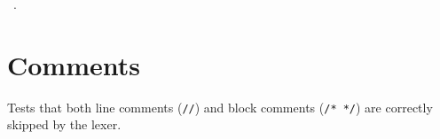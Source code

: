 \documentclass[11pt,a4paper,twoside,openright,DIV=15]{scrbook}
\theoremstyle{definition}
\theoremstyle{plain}
\theoremstyle{remark}
\begin{document}
\begin{flushleft}
\begin{minipage}{\linewidth}
\vspace{-1.5ex}
\footnotesize
\begin{list}{}{\setlength{\itemsep}{-\parsep}\setlength{\itemindent}{-\leftmargin}}
\item \NWtxtMacroRefIn\ .

\item{}
\end{list}
\end{minipage}\vspace{4ex}
\end{flushleft}
\section{Comments}

Tests that both line comments (\texttt{//}) and block comments
(\texttt{/* */}) are correctly skipped by the lexer.
\end{document}
